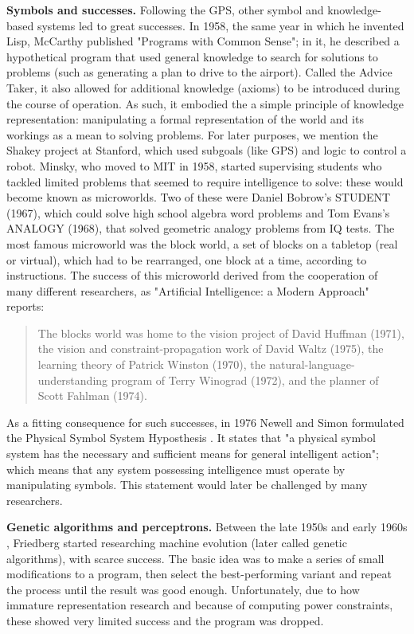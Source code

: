 \documentclass[../main.tex]{subfiles}
\begin{document}
\vspace{4pt}
\textbf{Symbols and successes.} Following the GPS, other symbol and knowledge-based systems led to great successes. In 1958, the same year in which he invented Lisp, McCarthy published "Programs with Common Sense"; in it, he described a hypothetical program that used general knowledge to search for solutions to problems (such as generating a plan to drive to the airport). Called the Advice Taker, it also allowed for additional knowledge (axioms) to be introduced during the course of operation. As such, it embodied the a simple principle of knowledge representation: manipulating a formal representation of the world and its workings as a mean to solving problems. For later purposes, we mention the Shakey project at Stanford, which used subgoals (like GPS) and logic to control a robot. Minsky, who moved to MIT in 1958, started supervising students who tackled limited problems that seemed to require intelligence to solve: these would become known as microworlds. Two of these were Daniel Bobrow's STUDENT (1967), which could solve high school algebra word problems and Tom Evans's ANALOGY (1968), that solved geometric analogy problems from IQ tests. The most famous microworld was the block world, a set of blocks on a tabletop (real or virtual), which had to be rearranged, one block at a time, according to instructions. The success of this microworld derived from the cooperation of many different researchers, as "Artificial Intelligence: a Modern Approach" reports:
\begin{quote}
    The blocks world was home to the vision project of David Huffman (1971), the vision and constraint-propagation work of David Waltz (1975), the learning theory of Patrick Winston (1970), the natural-language-understanding program of Terry Winograd (1972), and the planner of Scott Fahlman (1974).
\end{quote}\cite{russellArtificialIntelligenceModern2002}
As a fitting consequence for such successes, in 1976 Newell and Simon formulated the Physical Symbol System Hyposthesis \cite{newellComputerScienceEmpirical1976}. It states that "a physical symbol system has the necessary and sufficient means for general intelligent action"; which means that any system possessing intelligence must operate by manipulating symbols. This statement would later be challenged by many researchers.

\vspace{4pt}
\textbf{Genetic algorithms and perceptrons.} Between the late 1950s and early 1960s \cite{friedbergLearningMachinePart1958}, Friedberg started researching machine evolution (later called genetic algorithms), with scarce success. The basic idea was to make a series of small modifications to a program, then select the best-performing variant and repeat the process until the result was good enough. Unfortunately, due to how immature representation research and because of computing power constraints, these showed very limited success and the program was dropped.
\end{document}
